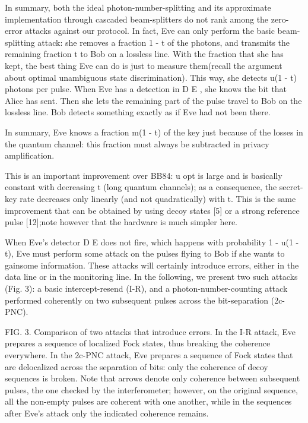 In summary, both the ideal photon-number-splitting and its approximate implementation through cascaded beam-splitters do not rank among the zero-error attacks against our protocol. In fact, Eve can only perform the basic beam-splitting attack: she removes a fraction 1 - t of the photons, and transmits the remaining fraction t to Bob on a lossless line. With the fraction that she has kept, the best thing Eve can do is just to measure them(recall the argument about optimal unambiguous state discrimination). This way, she detects u(1 - t) photons per pulse. When Eve has a detection in D E , she knows the bit that Alice has sent. Then she lets the remaining part of the pulse travel to Bob on the lossless line. Bob detects something exactly as if Eve had not been there.

In summary, Eve knows a fraction m(1 - t) of the key just because of the losses in the quantum channel: this fraction must always be subtracted in privacy amplification.


This is an important improvement over BB84: u opt is large and is basically constant with decreasing t (long quantum channels); as a consequence, the secret-key rate decreases only linearly (and not quadratically) with t. This is the same improvement that can be obtained by using decoy states [5] or a strong reference pulse [12];note however that the hardware is much simpler here.

When Eve’s detector D E does not fire, which happens with probability 1 - u(1 - t), Eve must perform some attack on the pulses flying to Bob if she wants to gainsome information. These attacks will certainly introduce errors, either in the data line or in the monitoring line. In the following, we present two such attacks (Fig. 3): a basic intercept-resend (I-R), and a photon-number-counting attack performed coherently on two subsequent pulses across the bit-separation (2c-PNC).

FIG. 3. Comparison of two attacks that introduce errors. In the I-R attack, Eve prepares a sequence of localized Fock states, thus breaking the coherence everywhere. In the 2c-PNC attack, Eve prepares a sequence of Fock states that are delocalized across the separation of bits: only the coherence of decoy sequences is broken. Note that arrows denote only coherence between subsequent pulses, the one checked by the interferometer; however, on the original sequence, all the non-empty pulses are coherent with one another, while in the sequences after Eve’s attack only the indicated coherence remains.

